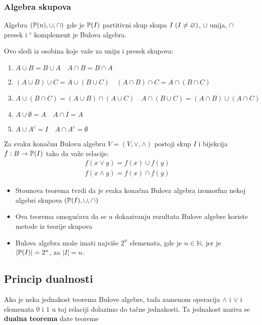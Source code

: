 \subsubsection{Algebra skupova}
	\begin{definition}
		Algebra $(\mathbb{P}(u), \cup, \cap)$ gde je $\mathbb{P}(I)$ partitivni skup skupa $I\; (I\centernot = \emptyset)$, $\cup$ unija, $\cap$ presek i $^c$ komplement je Bulova algebra.\\
	\end{definition}
	Ovo sledi iz osobina koje važe za uniju i presek skupova:
	\begin{enumerate}[label = \arabic*.]
		\item $A \cup B = B \cup A \quad A \cap B = B \cap A$
		\item $(A\cup B) \cup C = A \cup (B \cup C) \quad (A\cap B) \cap C = A \cap (B \cap C)$
		\item $A \cup (B \cap C) = (A \cup B) \cap (A \cup C) \quad A \cap (B \cup C) = (A \cap B) \cup (A \cap C)$
		\item $A \cup \emptyset = A \quad A \cap I = A$
		\item $A \cup A^c = I \quad A \cap A^c = \emptyset$
	\end{enumerate}
	\begin{theorem}
		Za svaku konačnu Bulovu algebru $V=(V, \lor, \land)$ postoji skup $I$ i bijekcija $f:B \to \mathbb{P}(I)$ tako da važe relacije:
		\begin{align*}
			f(x \lor y) = f(x) \cup f(y)\\
			f(x \land y) = f(x) \cap f(y)
		\end{align*}
	\end{theorem}
	\begin{corollary}
		\begin{itemize}
			\item Stounova teorema tvrdi da je svaka konačna Bulova algebra izomorfna nekoj algebri skupova $(\mathbb{P}(I), \cup, \cap)$
			\item Ova teorema omogućava da se u dokazivanju rezultata Bulove algebre koriste metode iz teorije skupova
			\item Bulova algebra može imati najviše $2^n$ elemenata, gde je $n \in \mathbb{N}$, jer je $\left| \mathbb{P}(I)\right| = 2^n$, za $|I|=n$.
		\end{itemize}
	\end{corollary}
\subsection{Princip dualnosti}
\begin{definition}
	Ako je neka jednakost teorema Bulove algebre, tada zamenom operacija $\land$ i $\lor$ i elemenata $0$ i $1$ u toj relaciji dolazimo do tačne jednakosti. Ta jednakost naziva se \textbf{dualna teorema} date teoreme
\end{definition}

